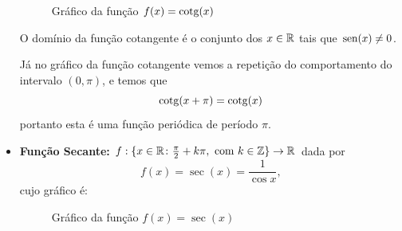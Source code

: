 \begin{itemize}
  \begin{figure}[H]
  \centering
    \caption{Gráfico da função $f(x)= \operatorname{cotg}(x)$}
  \end{figure}

  O domínio da função cotangente é o conjunto dos $x \in \mathbb{R}$ tais que $\operatorname{sen}(x) \neq 0$.

  Já no gráfico da função cotangente vemos a repetição do comportamento do intervalo $(0, \pi)$, e temos que
\begin{equation*}
\operatorname{cotg}(x + \pi)= \operatorname{cotg}(x)
\end{equation*}
  portanto esta é uma função periódica de período $\pi$.
  

 \item \textbf{Função Secante:} $f: \{x\in\mathbb{R} \colon \frac{\pi}{2} +k\pi, \mbox{ com } k \in \mathbb{Z}\} \rightarrow \mathbb{R}$ dada por
  \begin{equation*}
      f(x)= \sec(x) = \frac{1}{\cos x},
  \end{equation*}
    cujo gráfico é:

  \begin{figure}[H]
  \centering
    \caption{Gráfico da função $f(x)= \sec(x)$}
  \end{figure}


\end{itemize}
